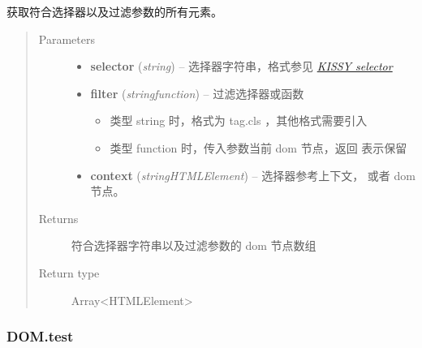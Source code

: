 \documentclass[letterpaper,10pt,english]{sphinxmanual}
\begin{document}
\begin{fulllineitems}
\label{api/core/dom/filter:DOM.filter}
获取符合选择器以及过滤参数的所有元素。
\begin{quote}\begin{description}
\item[{Parameters}] \leavevmode\begin{itemize}
\item {}
\textbf{selector} (\emph{string}) -- 选择器字符串，格式参见 {\hyperref[api/core/dom/selector:dom-selector]{\emph{KISSY selector}}}

\item {}
\textbf{filter} (\emph{string\textbar{}function}) --
过滤选择器或函数
\begin{itemize}
\item {}
类型 string 时，格式为 tag.cls ，其他格式需要引入 

\item {}
类型 function 时，传入参数当前 dom 节点，返回  表示保留

\end{itemize}


\item {}
\textbf{context} (\emph{string\textbar{}HTMLElement}) -- 选择器参考上下文，  或者 dom 节点。

\end{itemize}

\item[{Returns}] \leavevmode
符合选择器字符串以及过滤参数的 dom 节点数组

\item[{Return type}] \leavevmode
Array\textless{}HTMLElement\textgreater{}

\end{description}\end{quote}

\end{fulllineitems}



\subsubsection{DOM.test}
\label{api/core/dom/test::doc}\label{api/core/dom/test:dom-test}
\end{document}

